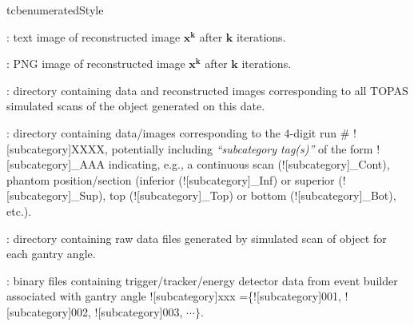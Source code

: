 \begin{tcbenvironment}
\begin{tcbparbox}{tcbenumeratedStyle}
\begin{ThinEnum}
\begin{ThinEnum}
\begin{ThinEnum}
\begin{ThinEnum}
\begin{ThinEnum}
\begin{ThinEnum}
\begin{ThinEnum}
\begin{ThinEnum}
\begin{ThinEnum}
\begin{ThinEnum}
                                                \begin{ThinEnum}
                                                    \item {} : text image of reconstructed image $\boldsymbol{x^k}$ after $\boldsymbol{k}$ iterations.
                                                    \item {} : PNG image of reconstructed image $\boldsymbol{x^k}$ after $\boldsymbol{k}$ iterations.
                                                \end{ThinEnum}
                                        \end{ThinEnum}
                                    \end{ThinEnum}
                                \end{ThinEnum}
                            \end{ThinEnum}
                        \end{ThinEnum}
                    \end{ThinEnum}
                \end{ThinEnum}
                \item {} : directory containing data and reconstructed images corresponding to all TOPAS simulated scans of the object generated on this date.
                \begin{ThinEnum}
                    \item {} : directory containing data/images corresponding to the 4-digit run \# \docentry![subcategory]{XXXX}, potentially including \emph{``subcategory tag(s)''} of the form \docentry![subcategory]{\_AAA} indicating, e.g., a continuous scan (\docentry![subcategory]{\_Cont}), phantom position/section (inferior (\docentry![subcategory]{\_Inf}) or superior (\docentry![subcategory]{\_Sup}), top (\docentry![subcategory]{\_Top}) or bottom (\docentry![subcategory]{\_Bot}), etc.).
                    \begin{ThinEnum}
                        \item {} : directory containing raw data files generated by simulated scan of object for each gantry angle.
                        \begin{ThinEnum}
                            \item {} : binary files containing trigger/tracker/energy detector data from event builder associated with gantry angle \docentry![subcategory]{xxx} =\{\docentry![subcategory]{001}, \docentry![subcategory]{002}, \docentry![subcategory]{003}, $\cdots\}$.

\end{ThinEnum}
\end{ThinEnum}
\end{ThinEnum}
\end{ThinEnum}
\end{ThinEnum}
\end{ThinEnum}
\end{tcbparbox}
\end{tcbenvironment}
